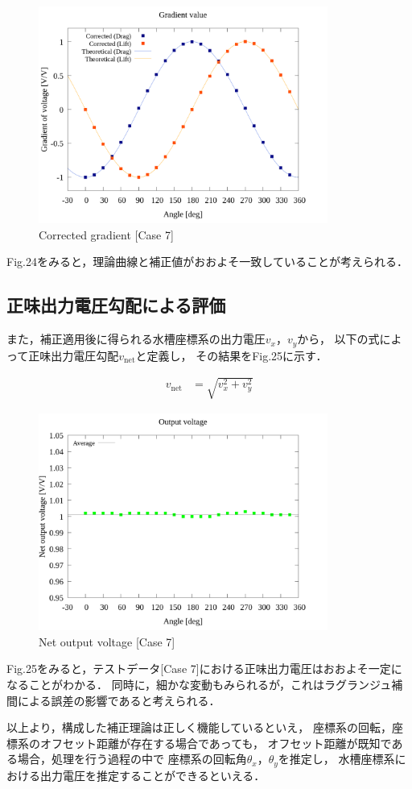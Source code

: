\begin{figure}[htbp]
  \begin{center}
    \includegraphics[width=95mm]{../../02_workspace/result/simulation_tx=10.0_ty=-5.0_dx=5.00_dy=-2.50/plot/21/21-4_summary.png}
    \caption{Corrected gradient [Case 7]}
  \end{center}
\end{figure}

Fig.24をみると，理論曲線と補正値がおおよそ一致していることが考えられる．

\subsection{正味出力電圧勾配による評価}

また，補正適用後に得られる水槽座標系の出力電圧$v_x$，$v_y$から，
以下の式によって正味出力電圧勾配$v_{\mathrm{net}}$と定義し，
その結果をFig.25に示す．

\begin{align}
  v_{\mathrm{net}} & = \sqrt{v_x^2 + v_y^2}
\end{align}

\begin{figure}[htbp]
  \begin{center}
    \includegraphics[width=95mm]{../../02_workspace/result/simulation_tx=10.0_ty=-5.0_dx=5.00_dy=-2.50/plot/09/09_summary-outputvoltage-net.png}
    \caption{Net output voltage [Case 7]}
  \end{center}
\end{figure}

Fig.25をみると，テストデータ[Case 7]における正味出力電圧はおおよそ一定になることがわかる．
同時に，細かな変動もみられるが，これはラグランジュ補間による誤差の影響であると考えられる．

以上より，構成した補正理論は正しく機能しているといえ，
座標系の回転，座標系のオフセット距離が存在する場合であっても，
オフセット距離が既知である場合，処理を行う過程の中で
座標系の回転角$\theta_x$，$\theta_y$を推定し，
水槽座標系における出力電圧を推定することができるといえる．

\newpage